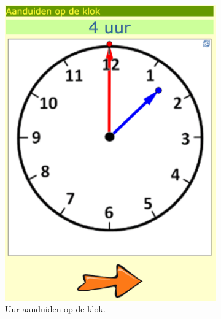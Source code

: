 \documentclass[a4paper,11pt]{article}
\theoremstyle{definition}
\begin{document}
\begin{itemize}
\begin{itemize}
\begin{figure}[h!]
\begin{subfigure}{.5\textwidth}
                \includegraphics[scale=0.15]{klok1.jpg}
                \caption{Uur aanduiden op de klok.}
                \label{klok1}
        \end{subfigure}%
        \begin{subfigure}{.5\textwidth}
           \centering

\end{subfigure}
\end{figure}
\end{itemize}
\end{itemize}
\end{document}
